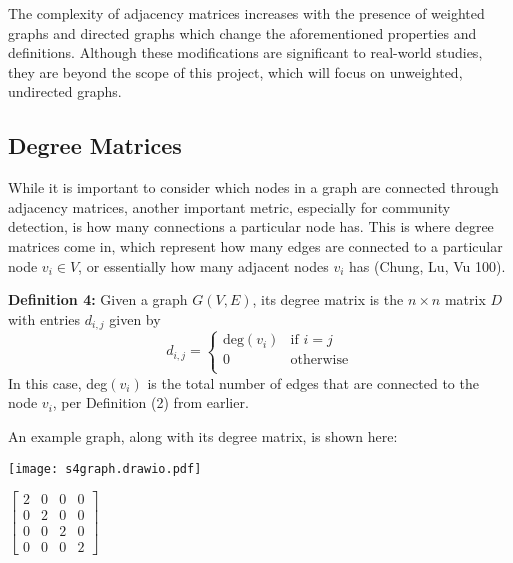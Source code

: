 \documentclass{article}
\begin{document}
\bigskip 

The complexity of adjacency matrices increases with the presence of weighted graphs and directed graphs which change the aforementioned properties and definitions. 
Although these modifications are significant to real-world studies, they are beyond the scope of this project, which will focus on unweighted, undirected graphs.


\bigskip 


\subsection{Degree Matrices}

\bigskip

While it is important to consider which nodes in a graph are connected through adjacency matrices, another important metric, especially for community detection, is how many connections a particular node has.
This is where degree matrices come in, which represent how many edges are connected to a particular node $v_i \in V$, or essentially how many adjacent nodes $v_i$ has (Chung, Lu, Vu 100).

\bigskip 

\textbf{Definition 4:} Given a graph $G(V, E)$, its degree matrix is the $n \times n$ matrix $D$ with entries $d_{i,j}$ given by
\[   
d_{i,j} = 
     \begin{cases}
       \text{deg} (v_i) & \text{if } i = j \\
       0 & \text{otherwise} \\
     \end{cases}
\]
In this case, deg$(v_i)$ is the total number of edges that are connected to the node $v_i$, per Definition (2) from earlier.

\bigskip 

An example graph, along with its degree matrix, is shown here:

\bigskip

\noindent\begin{minipage}{.5\textwidth}
\centering
\texttt{[image: s4graph.drawio.pdf]}
\label{fig:fig3}            
\end{minipage}%
\begin{minipage}{.5\textwidth}
\centering
\vspace{1cm}
 $\begin{bmatrix}
2 & 0 & 0 & 0\\
0 & 2 & 0 & 0\\
0 & 0 & 2 & 0\\
0 & 0 & 0 & 2
\end{bmatrix}$
\vspace{0.88cm}

\label{fig:fig4}            
\end{minipage}
\end{document}

